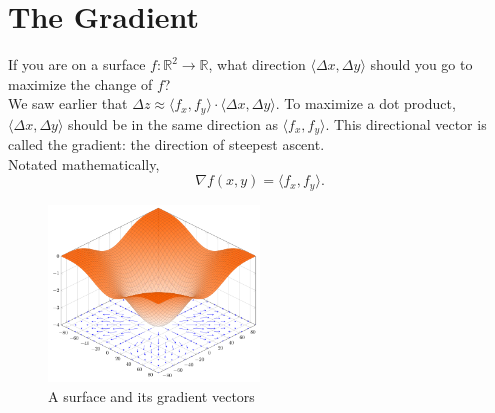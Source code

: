 \section{The Gradient}
\noindent
If you are on a surface $f: \mathbb{R}^2 \to \mathbb{R}$, what direction $\langle \Delta x, \Delta y \rangle$ should you go to maximize the change of $f$?\\
We saw earlier that $\Delta z\approx \langle f_x, f_y \rangle \cdot \langle \Delta x, \Delta y \rangle$.
To maximize a dot product, $\langle \Delta x, \Delta y \rangle$ should be in the same direction as $\langle f_x, f_y \rangle$.
This directional vector is called the gradient: the direction of steepest ascent.\\
Notated mathematically,
\begin{equation*}
	\nabla f(x,y) = \langle f_x, f_y \rangle.
\end{equation*}

\begin{figure}[H]
	\centering
	\includegraphics[width=0.5\textwidth]{./Images/differentialMultivariableCalculus/gradient.png}
	\caption{A surface and its gradient vectors}
\end{figure}




